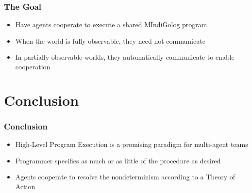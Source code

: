 \documentclass{beamer}
\begin{document}
\begin{frame}
\frametitle{The Goal}
\begin{itemize}
  \item Have agents cooperate to execute a shared MIndiGolog program
  \item When the world is fully observable, they need not communicate
  \item In partially observable worlds, they automatically communicate
 to enable cooperation
\end{itemize}
\end{frame}

\section{Conclusion}

\begin{frame}
\frametitle{Conclusion}
\begin{itemize}
  \item High-Level Program Execution is a promising paradigm for multi-agent teams
  \item Programmer specifies as much or as little of the procedure as
desired
  \item Agents cooperate to resolve the nondeterminism according to a
Theory of Action
\end{itemize}
\end{frame}



\end{document}
